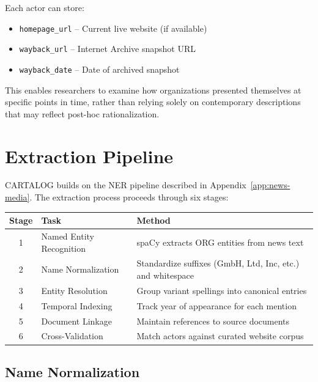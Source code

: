 \documentclass[../main.tex]{subfiles}
\begin{document}
Each actor can store:
\begin{itemize}[leftmargin=*, itemsep=0.2em]
\item \texttt{homepage\_url} -- Current live website (if available)
\item \texttt{wayback\_url} -- Internet Archive snapshot URL
\item \texttt{wayback\_date} -- Date of archived snapshot
\end{itemize}

This enables researchers to examine how organizations presented themselves at specific points in time, rather than relying solely on contemporary descriptions that may reflect post-hoc rationalization.


\section{Extraction Pipeline}

\textsc{CARTALOG} builds on the NER pipeline described in Appendix~\ref{app:news-media}. The extraction process proceeds through six stages:

\tableminimal
\begin{center}
\begin{tabular}{@{}clp{6.5cm}@{}}
\toprule
\textbf{Stage} & \textbf{Task} & \textbf{Method} \\
\midrule
1 & Named Entity Recognition & spaCy extracts ORG entities from news text \\
2 & Name Normalization & Standardize suffixes (GmbH, Ltd, Inc, etc.) and whitespace \\
3 & Entity Resolution & Group variant spellings into canonical entries \\
4 & Temporal Indexing & Track year of appearance for each mention \\
5 & Document Linkage & Maintain references to source documents \\
6 & Cross-Validation & Match actors against curated website corpus \\
\bottomrule
\end{tabular}
\end{center}

\subsection{Name Normalization}
\end{document}
